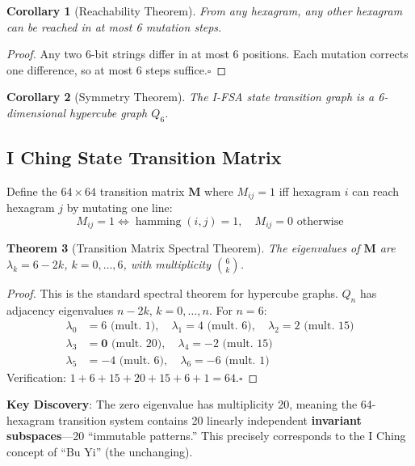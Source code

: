 \documentclass[conference]{IEEEtran}
\newtheorem{theorem}{Theorem}[section]
\newtheorem{corollary}[theorem]{Corollary}
\theoremstyle{remark}
\newcommand{\hamming}{\operatorname{hamming}}
\newcommand{\IFF}{\Leftrightarrow}
\begin{document}
\begin{corollary}[Reachability Theorem]
From any hexagram, any other hexagram can be reached in at most 6 mutation steps.
\end{corollary}
\begin{proof}
Any two 6-bit strings differ in at most 6 positions. Each mutation corrects one difference, so at most 6 steps suffice.\hfill$\square$
\end{proof}

\begin{corollary}[Symmetry Theorem]
The I-FSA state transition graph is a 6-dimensional hypercube graph $Q_6$.
\end{corollary}

\subsection{I Ching State Transition Matrix}

Define the $64\times 64$ transition matrix $\mathbf{M}$ where $M_{ij}=1$ iff hexagram $i$ can reach hexagram $j$ by mutating one line:
\[
M_{ij} = 1 \IFF \hamming(i,j) = 1,\quad M_{ij} = 0 \text{ otherwise}
\]

\begin{theorem}[Transition Matrix Spectral Theorem]
The eigenvalues of $\mathbf{M}$ are $\lambda_k = 6-2k$, $k=0,\ldots,6$, with multiplicity $\binom{6}{k}$.
\end{theorem}
\begin{proof}
This is the standard spectral theorem for hypercube graphs. $Q_n$ has adjacency eigenvalues $n-2k$, $k=0,\ldots,n$. For $n=6$:
\begin{align*}
\lambda_0 &= 6 \text{ (mult. 1)},\quad \lambda_1 = 4 \text{ (mult. 6)},\quad \lambda_2 = 2 \text{ (mult. 15)}\\
\lambda_3 &= \mathbf{0} \text{ (mult. 20)},\quad \lambda_4 = -2 \text{ (mult. 15)}\\
\lambda_5 &= -4 \text{ (mult. 6)},\quad \lambda_6 = -6 \text{ (mult. 1)}
\end{align*}
Verification: $1+6+15+20+15+6+1 = 64$.\hfill$\square$
\end{proof}

\textbf{Key Discovery}: The zero eigenvalue has multiplicity 20, meaning the 64-hexagram transition system contains 20 linearly independent \textbf{invariant subspaces}---20 ``immutable patterns.'' This precisely corresponds to the I Ching concept of ``Bu Yi'' (the unchanging).
\end{document}
